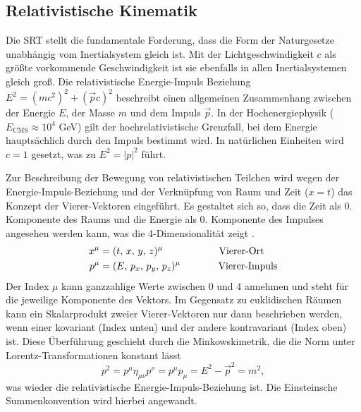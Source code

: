 \documentclass[11pt,a4paper,twoside]{report}
\begin{document}
\subsection{Relativistische Kinematik}
Die SRT stellt die fundamentale Forderung, dass die Form der Naturgesetze unabhängig vom Inertialsystem gleich ist. Mit der Lichtgeschwindigkeit $c$ als
größte vorkommende Geschwindigkeit ist sie ebenfalls in allen Inertialsystemen gleich groß. Die relativistische Energie-Impuls Beziehung 
$E^2 = \left(mc^2\right)^2 + \left(\vec pc\right)^2$ beschreibt einen allgemeinen Zusammenhang zwischen der Energie $E$, der Masse $m$ und dem Impuls $\vec p$.
In der Hochenergiephysik ($E_{\text{CMS}} \approx 10^4$ GeV) gilt der hochrelativistische Grenzfall, bei dem Energie hauptsächlich durch den Impuls bestimmt wird.
In natürlichen Einheiten wird $c = 1$ gesetzt, was zu $E^2 = \left|p\right|^2$ führt.

Zur Beschreibung der Bewegung von relativistischen Teilchen wird wegen der Energie-Impuls-Beziehung und der Verknüpfung von Raum und Zeit ($x = t$) das Konzept
der Vierer-Vektoren eingeführt. Es gestaltet sich so, dass die Zeit als 0. Komponente des Raums und die Energie als 0. Komponente des Impulses angesehen werden
kann, was die 4-Dimensionalität zeigt \cite{RelKin}.
\begin{align}
 x^\mu &= (t,\,x,\,y,\,z)^\mu \hspace{2cm} \text{Vierer-Ort}\\
 p^\mu &= (E,\,p_x,\,p_y,\,p_z)^\mu \hspace{1.35cm} \text{Vierer-Impuls}
\end{align}
Der Index $\mu$ kann ganzzahlige Werte zwischen 0 und 4 annehmen und steht für die jeweilige Komponente des Vektors. Im Gegensatz zu euklidischen Räumen 
kann ein Skalarprodukt zweier Vierer-Vektoren nur dann beschrieben werden, wenn einer kovariant (Index unten) und der andere kontravariant (Index oben) ist.
Diese Überführung geschieht durch die Minkowskimetrik, die die Norm unter Lorentz-Transformationen konstant lässt
\begin{equation}
  p^2 = p^\mu \eta_{\mu \nu} p^\nu = p^\mu p_\mu = E^2 - \vec p^2 = m^2,
\end{equation}
was wieder die relativistische Energie-Impuls-Beziehung ist. Die Einsteinsche Summenkonvention wird hierbei angewandt.
\end{document}
